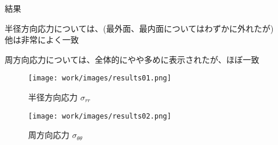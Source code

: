 \begin{frame}{結果}
 
  半径方向応力については、(最外面、最内面についてはわずかに外れたが) \\
  他は非常によく一致

  周方向応力については、全体的にやや多めに表示されたが、ほぼ一致　
\begin{figure}[htbp]
\centering
  \begin{minipage}{0.49\columnwidth}
     \centering
     \texttt{[image: work/images/results01.png]}
     \caption{半径方向応力
       \begin{math}
         σ_{rr}
       \end{math}
     }
     \label{fig:hidari}
  \end{minipage}
%
  \begin{minipage}{0.49\columnwidth}
     \centering
     \texttt{[image: work/images/results02.png]}
     \caption{周方向応力
       \begin{math}
         σ_{\theta\theta}
       \end{math}
     }
     \label{fig:migi}
  \end{minipage}
\end{figure}

\end{frame}
